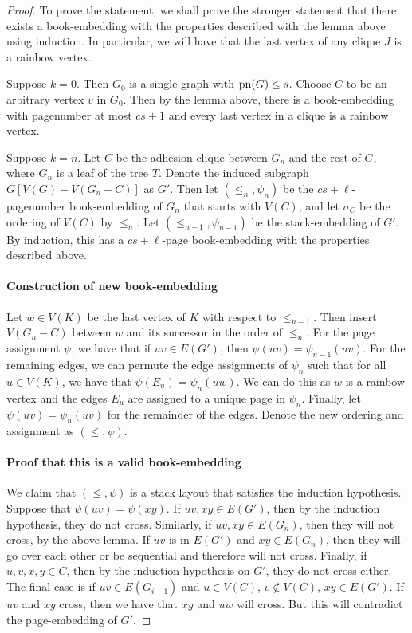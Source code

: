 \begin{proof}
	To prove the statement, we shall prove the stronger statement that there exists a book-embedding with the properties described with the lemma above using induction. In particular, we will have that the last vertex of any clique \(J\) is a rainbow vertex.

	Suppose \(k = 0\). Then \(G_0\) is a single graph with \(\operatorname{pn}(G) \leq s\). Choose \(C\) to be an arbitrary vertex \(v\) in \(G_0\). Then by the lemma above, there is a book-embedding with pagenumber at most \(cs + 1\) and every last vertex in a clique is a rainbow vertex.

	Suppose \(k = n\). Let \(C\) be the adhesion clique between \(G_n\) and the rest of \(G\), where \(G_n\) is a leaf of the tree \(T\). Denote the induced subgraph \(G[V(G) - V(G_n - C)]\) as \(G'\). Then let \((\leq_n, \psi_n)\) be the \(cs + \ell\)-pagenumber book-embedding of \(G_n\) that starts with \(V(C)\), and let \(\sigma_C\) be the ordering of \(V(C)\) by \(\leq_n\). Let \((\leq_{n-1}, \psi_{n-1})\) be the stack-embedding of \(G'\). By induction, this has a \(cs + \ell\)-page book-embedding with the properties described above.

	\paragraph{Construction of new book-embedding}
	Let \(w \in V(K)\) be the last vertex of \(K\) with respect to \(\leq_{n-1}\). Then insert \(V(G_n - C)\) between \(w\) and its successor in the order of \(\leq_{n}\). For the page assignment \(\psi\), we have that if \(uv \in E(G')\), then \(\psi(uv) = \psi_{n-1}(uv)\). For the remaining edges, we can permute the edge assignments of \(\psi_n\) such that for all \(u \in V(K)\), we have that \(\psi(E_u) = \psi_n(uw)\). We can do this as \(w\) is a rainbow vertex and the edges \(E_u\) are assigned to a unique page in \(\psi_n\). Finally, let \(\psi(uv) = \psi_n(uv)\) for the remainder of the edges. Denote the new ordering and assignment as \((\leq, \psi)\).
	\paragraph{Proof that this is a valid book-embedding}
	We claim that \((\leq , \psi)\) is a stack layout that satisfies the induction hypothesis. Suppose that \(\psi(uv) = \psi(xy)\). If \(uv, xy \in E(G')\), then by the induction hypothesis, they do not cross. Similarly, if \(uv, xy \in E(G_n)\), then they will not cross, by the above lemma. If \(uv\) is in \(E(G')\) and \(xy \in E(G_n)\), then they will go over each other or be sequential and therefore will not cross.
	Finally, if \(u, v, x, y \in C\), then by the induction hypothesis on \(G'\), they do not cross either. The final case is if \(uv \in E(G_{i + 1})\) and \(u \in V(C)\), \(v \notin V(C)\), \(xy \in E(G')\). If \(uv\) and \(xy\) cross, then we have that \(xy\) and \(uw\) will cross. But this will contradict the page-embedding of \(G'\).


\end{proof}
